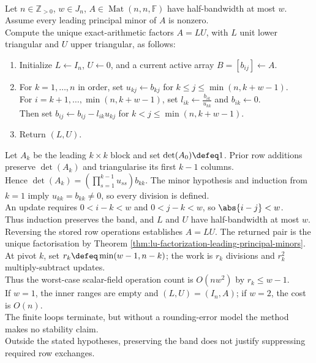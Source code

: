 \begin{computationmethod} \label{meth:banded-elimination-preview} \\
Let $n\in\mathbb{Z}_{>0}$, $w\in J_n$, $A\in\operatorname{Mat}(n,n,\mathbb{F})$ have half-bandwidth at most $w$. Assume every leading principal minor of $A$ is nonzero.\\
Compute the unique exact-arithmetic factors $A=LU$, with $L$ unit lower triangular and $U$ upper triangular, as follows:
\begin{enumerate}[label=(\roman*)]
\setlength{\itemsep}{0pt}
\item Initialize $L\gets I_n$, $U\gets0$, and a current active array $B=[b_{ij}]\gets A$.
\item For $k=1,\ldots,n$ in order, set $u_{kj}\gets b_{kj}$ for $k\leq j\leq\min(n,k+w-1)$.\\
For $i=k+1,\ldots,\min(n,k+w-1)$, set $l_{ik}\gets\frac{b_{ik}}{u_{kk}}$ and $b_{ik}\gets0$.\\
Then set $b_{ij}\gets b_{ij}-l_{ik}u_{kj}$ for $k<j\leq\min(n,k+w-1)$.
\item Return $(L,U)$.
\end{enumerate}
Let $A_k$ be the leading $k\times k$ block and set $\det(A_0)\defeq1$. Prior row additions preserve $\det(A_k)$ and triangularise its first $k-1$ columns.\\
Hence $\det(A_k)=\left(\prod\limits_{s=1}^{k-1}u_{ss}\right)b_{kk}$. The minor hypothesis and induction from $k=1$ imply $u_{kk}=b_{kk}\neq0$, so every division is defined.\\
An update requires $0<i-k<w$ and $0<j-k<w$, so $\abs{i-j}<w$.\\
Thus induction preserves the band, and $L$ and $U$ have half-bandwidth at most $w$.\\
Reversing the stored row operations establishes $A=LU$. The returned pair is the unique factorisation by Theorem \ref{thm:lu-factorization-leading-principal-minors}.\\
At pivot $k$, set $r_k\defeq\min(w-1,n-k)$; the work is $r_k$ divisions and $r_k^2$ multiply-subtract updates.\\
Thus the worst-case scalar-field operation count is $O(nw^2)$ by $r_k\leq w-1$.\\
If $w=1$, the inner ranges are empty and $(L,U)=(I_n,A)$; if $w=2$, the cost is $O(n)$.\\
The finite loops terminate, but without a rounding-error model the method makes no stability claim.\\
Outside the stated hypotheses, preserving the band does not justify suppressing required row exchanges.
\end{computationmethod}

